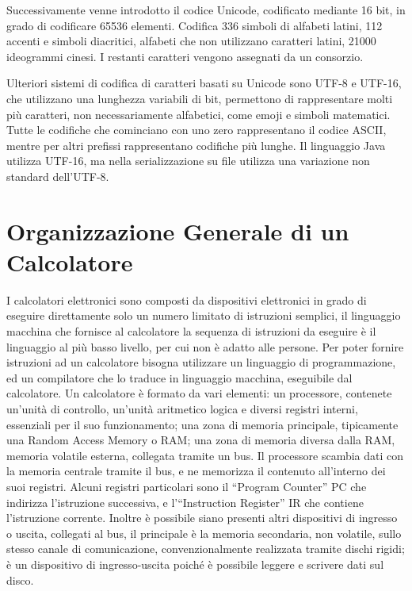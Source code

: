 \documentclass{article}
\numberwithin{equation}{subsection}
\begin{document}
Successivamente venne introdotto il codice Unicode, codificato mediante 16 bit, in grado di codificare 65536 elementi. Codifica 336 simboli di alfabeti latini, 112 accenti e simboli diacritici, alfabeti che non 
utilizzano caratteri latini, 21000 ideogrammi cinesi. I restanti caratteri vengono assegnati da un consorzio. 

Ulteriori sistemi di codifica di caratteri basati su Unicode sono UTF-8 e UTF-16, che utilizzano una lunghezza variabili di bit, permettono di rappresentare molti più caratteri, non necessariamente alfabetici, come 
emoji e simboli matematici. Tutte le codifiche che cominciano con uno zero rappresentano il codice ASCII, mentre per altri prefissi rappresentano codifiche più lunghe. 
Il linguaggio Java utilizza UTF-16, ma nella serializzazione su file utilizza una variazione non standard dell'UTF-8. 

\clearpage

\section{Organizzazione Generale di un Calcolatore}

I calcolatori elettronici sono composti da dispositivi elettronici in grado di eseguire direttamente solo un numero limitato di istruzioni semplici, il linguaggio macchina che fornisce al calcolatore la sequenza di 
istruzioni da eseguire è il linguaggio al più basso livello, per cui non è adatto alle persone. Per poter fornire istruzioni ad un calcolatore bisogna utilizzare un linguaggio di 
programmazione, ed un compilatore che lo traduce in linguaggio macchina, eseguibile dal calcolatore. 
Un calcolatore è formato da vari elementi: un processore, contenete un'unità di controllo, un'unità aritmetico logica e diversi 
registri interni, essenziali per il suo funzionamento; una zona di memoria principale, tipicamente una Random Access Memory o RAM; una zona di memoria diversa dalla RAM, memoria volatile esterna, collegata tramite 
un bus. Il processore scambia dati con la memoria centrale tramite il bus, e ne memorizza il contenuto all'interno dei suoi registri. Alcuni registri particolari sono il ``Program Counter'' PC che indirizza l'istruzione 
successiva, e l'``Instruction Register'' IR che contiene l'istruzione corrente. Inoltre è possibile siano presenti altri dispositivi di ingresso o uscita, collegati al bus, il principale è la memoria secondaria, non 
volatile, sullo stesso canale di comunicazione, convenzionalmente realizzata tramite dischi rigidi; è un dispositivo di ingresso-uscita poiché è possibile leggere e scrivere dati sul disco.
\end{document}
